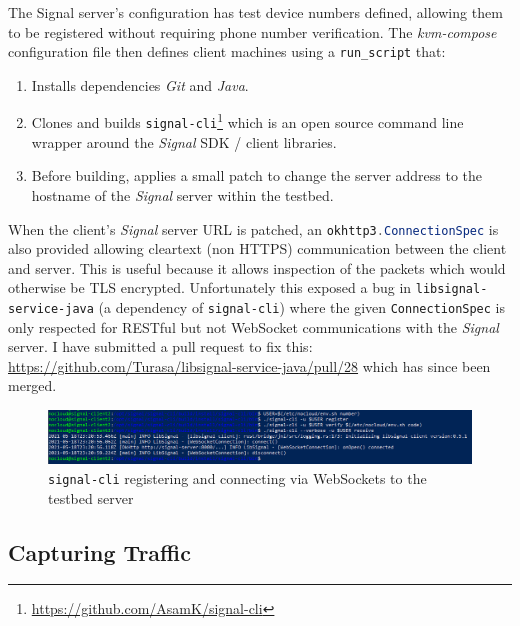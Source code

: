 \documentclass[
    author={Jacob Daniel Halsey},
    supervisor={Prof. Awais Rashid},
    degree={BSc},
    title={Building a Testbed for Evaluating Privacy Enhancing Technologies  (PETs)},
    subtitle={},
    type={software development},
    year={2021}
]{dissertation}
\begin{document}
The Signal server's configuration has test device numbers defined, allowing them
to be registered without requiring phone number verification.
The \emph{kvm-compose} configuration file then defines client 
machines using a \texttt{run\_script} that:

\begin{singlespace}
	\begin{enumerate}
		\item Installs dependencies \emph{Git} and \emph{Java}.
		\item Clones and builds \texttt{signal-cli}\footnote{\url{https://github.com/AsamK/signal-cli}}
		which is an open source command line wrapper around the \emph{Signal} SDK / client libraries.
		\item Before building, applies a small patch to change the server address to the hostname of the 
		\emph{Signal} server within the testbed. 
	\end{enumerate}
\end{singlespace}

When the client's \emph{Signal} server URL is patched, an \lstinline[language=java]|okhttp3.ConnectionSpec|
is also provided allowing cleartext (non HTTPS) communication between the client and server. This is useful
because it allows inspection of the packets which would otherwise be TLS encrypted. Unfortunately this 
exposed a bug in \texttt{libsignal-service-java} (a dependency of \texttt{signal-cli}) where the given
\lstinline[language=java]|ConnectionSpec| is only respected for RESTful but not WebSocket communications
with the \emph{Signal} server. I have submitted a pull request to fix this: \url{https://github.com/Turasa/libsignal-service-java/pull/28} which has since been merged.

\begin{figure}
	\centering
	\includegraphics[width=16cm]{img/signal-cli}
	\caption{\texttt{signal-cli} registering and connecting via WebSockets to the testbed server}
	\label{fig:signal_cli}
\end{figure}

\subsection{Capturing Traffic}
\end{document}
